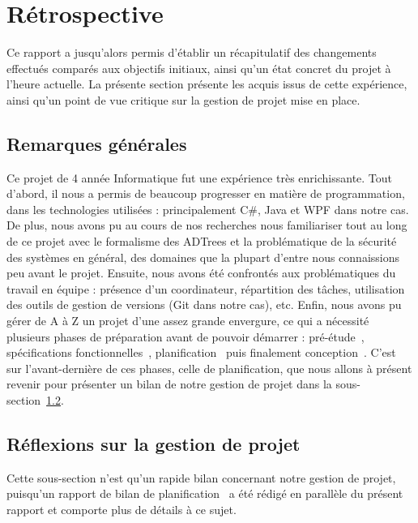 \section{Rétrospective}
\label{sec:retro}

Ce rapport a jusqu'alors permis d'établir un récapitulatif des changements effectués comparés aux objectifs initiaux, ainsi qu'un état concret du projet à l'heure actuelle. La présente section présente les acquis issus de cette expérience, ainsi qu'un point de vue critique sur la gestion de projet mise en place.

\subsection{Remarques générales}
\label{ssec:rq_gen}

Ce projet de 4\ieme{} année Informatique fut une expérience très enrichissante. Tout d'abord, il nous a permis de beaucoup progresser en matière de programmation, dans les technologies utilisées : principalement C\#, Java et WPF dans notre cas. De plus, nous avons pu au cours de nos recherches nous familiariser tout au long de ce projet avec le formalisme des ADTrees et la problématique de la sécurité des systèmes en général, des domaines que la plupart d'entre nous connaissions peu avant le projet. Ensuite, nous avons été confrontés aux problématiques du travail en équipe : présence d'un coordinateur, répartition des tâches, utilisation des outils de gestion de versions (Git dans notre cas), etc. Enfin, nous avons pu gérer de A à Z un projet d'une assez grande envergure, ce qui a nécessité plusieurs phases de préparation avant de pouvoir démarrer : pré-étude~\cite{pre_etude}, spécifications fonctionnelles~\cite{spec_fonc}, planification~\cite{planif} puis finalement conception~\cite{conception}. C'est sur l'avant-dernière de ces phases, celle de planification, que nous allons à présent revenir pour présenter un bilan de notre gestion de projet dans la {\sc sous-section}~\ref{ssec:gestionProjet}.

\subsection{Réflexions sur la gestion de projet}
\label{ssec:gestionProjet}

Cette sous-section n'est qu'un rapide bilan concernant notre gestion de projet, puisqu'un rapport de bilan de planification~\cite{bilanPlanif} a été rédigé en parallèle du présent rapport et comporte plus de détails à ce sujet.

